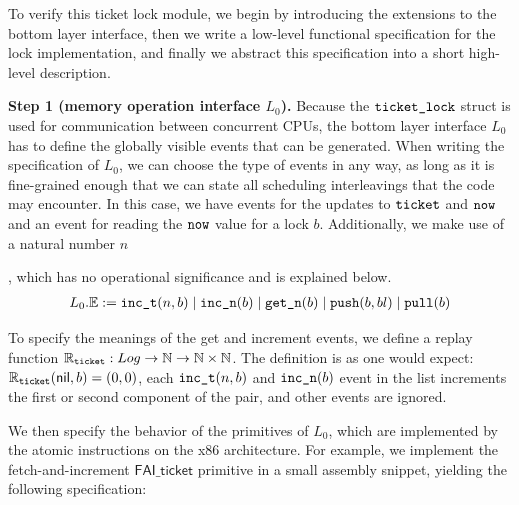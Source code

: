 {To verify this ticket lock module,
we begin by 
introducing the extensions to the bottom layer interface,
then we write a
low-level functional specification for the lock implementation,
and finally we abstract this specification into a short
high-level description.


\noindent\textbf{Step 1 (memory operation interface $L_0$).}
Because the $\comm{ticket\_lock}$ struct is used for communication
between concurrent CPUs, 
the bottom layer interface $L_0$
has to define the globally visible events that can be generated. 
When writing the specification of $L_0$,  we can choose the type of events in any way, as long
as it is 
fine-grained enough that we can state all scheduling interleavings that
the code may encounter. In this case, we have events for the updates to
$\ticket$ and $\now$ and an event for reading the $\now$ value
for a lock $b$. Additionally, we make use of a natural number 
$n$, which has no
operational significance and is explained below.
\[
\begin{array}{c}
L_0.\Ev := \incticket(n, b) \mid \incnow(b) \mid \getnow(b)
\mid \push(b,bl) \mid \pull(b)
\ignore{\\
&  \mid &  \holdlock \mid \tshared (e : \mathsf{SharedMemEvent})}
\end{array}
\]%

To specify the meanings of the get and increment events, we define a replay
function $\replay_{\comm{ticket}} : Log \to \integer \to \integer\times \integer$. 
The definition is as one would expect:
$\replay_{\comm{ticket}}(\mathsf{nil}, b) = (0,0)$, each 
$\incticket(n, b)$ and $\incnow(b)$ event in the list increments
the first or second component of the pair, and other events are ignored.

We then specify the behavior of the primitives
of $L_0$, which are implemented by the atomic instructions on the x86 architecture. 
For example, we implement the
fetch-and-increment $\mathsf{FAI\_ticket}$ primitive in a small 
assembly snippet, yielding the following specification:
\begin{mathpar}
\end{mathpar}%

}
